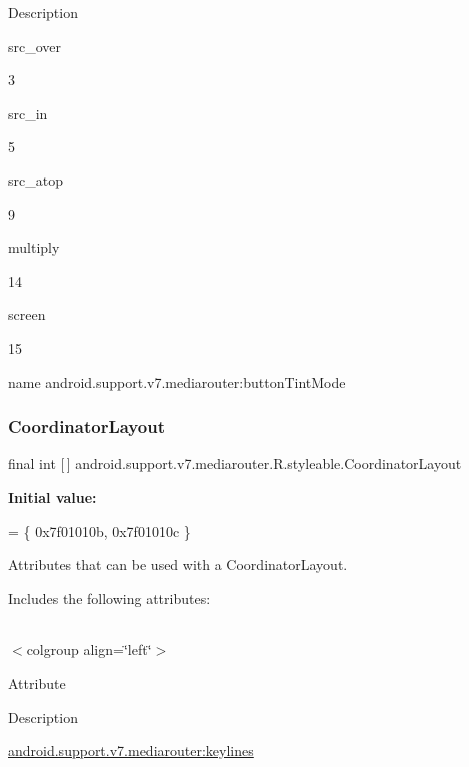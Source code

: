 Description 

{\ttfamily src\+\_\+over}

3

{\ttfamily src\+\_\+in}

5

{\ttfamily src\+\_\+atop}

9

{\ttfamily multiply}

14

{\ttfamily screen}

15

name android.\+support.\+v7.\+mediarouter\+:button\+Tint\+Mode \mbox{\label{classandroid_1_1support_1_1v7_1_1mediarouter_1_1R_1_1styleable_ae61e7ce081662158e58eb0cf6923a3cb}} 
\subsubsection{\texorpdfstring{Coordinator\+Layout}{CoordinatorLayout}}
{\footnotesize\ttfamily final int \mbox{[}$\,$\mbox{]} android.\+support.\+v7.\+mediarouter.\+R.\+styleable.\+Coordinator\+Layout\hspace{0.3cm}{\ttfamily [static]}}

{\bfseries Initial value\+:}
\begin{DoxyCode}
= \{
            0x7f01010b, 0x7f01010c
        \}
\end{DoxyCode}
Attributes that can be used with a Coordinator\+Layout. 

Includes the following attributes\+:

\tabulinesep=1mm
\begin{longtabu} spread 0pt [c]{*{0}{|X[-1]}|}
\hline
\end{longtabu}
$<$colgroup align=\char`\"{}left\char`\"{}$>$ 

Attribute

Description 

{\ttfamily \hyperlink{classandroid_1_1support_1_1v7_1_1mediarouter_1_1R_1_1styleable_ae86cea8b9a6e3208df0e1e6176ee9287}{android.\+support.\+v7.\+mediarouter\+:keylines}}

